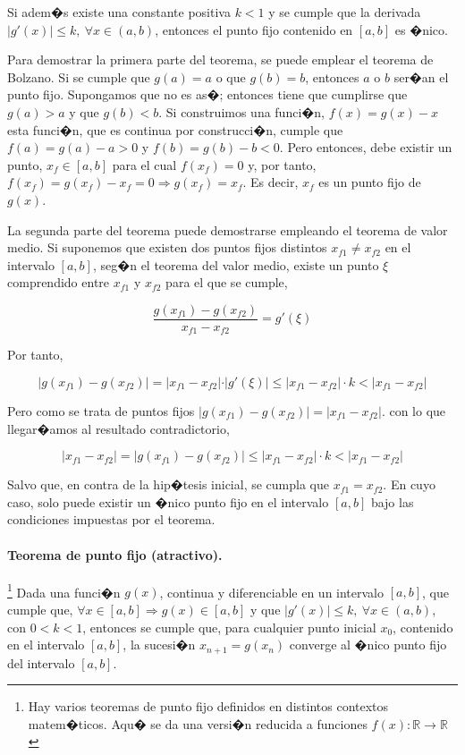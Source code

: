 Si adem�s existe una constante positiva $k < 1$  y se  cumple que  la derivada $\vert g'(x) \vert \leq k, \  \forall x \in (a, b)$, entonces el punto fijo contenido en $[a,b]$ es �nico. 

Para demostrar la primera parte del teorema, se puede emplear el teorema de Bolzano. Si se cumple que $g(a)=a$ o que  $g(b)=b$, entonces $a$ o $b$ ser�an el punto fijo. Supongamos que no es as�;  entonces tiene que cumplirse que $g(a)>a$ y que $g(b)<b$. Si construimos una funci�n, $f(x)=g(x)-x$ esta funci�n, que es continua por construcci�n, cumple que $f(a)=g(a)-a>0$ y $f(b)=g(b)-b<0$. Pero entonces, debe existir un punto, $x_f \in [a, b]$ para el cual $f(x_f)=0$ y, por tanto, $f(x_f)=g(x_f)-x_f=0 \Rightarrow g(x_f)=x_f$. Es decir, $x_f$ es un punto fijo de $g(x)$.

La segunda parte del teorema puede demostrarse empleando el teorema de valor medio. Si suponemos  que existen dos puntos fijos distintos $x_{f1} \neq x_{f2}$ en el intervalo $[a,b]$, seg�n el teorema del valor medio, existe un punto $\xi$ comprendido entre $x_{f1}$ y $ x_{f2}$ para el que se cumple,

\begin{equation*}
\frac{g(x_{f1})-g(x_{f2})}{x_{f1}-x_{f2}}=g'(\xi)
\end{equation*}

Por tanto,

\begin{equation*}
\vert g(x_{f1})-g(x_{f2}) \vert =\vert x_{f1}-x_{f2} \vert\cdot \vert g'(\xi) \vert \leq \vert x_{f1}-x_{f2} \vert \cdot k < \vert x_{f1}-x_{f2} \vert 
\end{equation*}

Pero como se trata de puntos fijos $\vert g(x_{f1})-g(x_{f2}) \vert =\vert x_{f1}-x_{f2}\vert $. con lo que llegar�amos al resultado contradictorio, 

 \begin{equation*}
\vert x_{f1}-x_{f2}\vert=\vert g(x_{f1})-g(x_{f2}) \vert  \leq \vert x_{f1}-x_{f2} \vert\cdot k < \vert x_{f1}-x_{f2} \vert 
\end{equation*}

Salvo que, en contra de la hip�tesis inicial, se cumpla que  $ x_{f1}=x_{f2}$. En cuyo caso, solo puede existir un �nico punto fijo en el intervalo $[a, b]$ bajo las condiciones impuestas por el teorema.

\paragraph{Teorema de punto fijo (atractivo).} \footnote{Hay varios teoremas de punto fijo definidos en distintos contextos matem�ticos. Aqu� se da una versi�n reducida a funciones $f(x):\mathbb{R} \rightarrow \mathbb{R}$} Dada una funci�n $g(x)$,  continua y diferenciable en un intervalo $[a, b]$, que  cumple que, $\forall x \in [a, b] \Rightarrow g(x)\in [a,b]$ y que  $\vert g'(x) \vert \leq k, \  \forall x \in (a, b)$, con $0<k<1$, entonces se cumple que, para cualquier punto inicial $x_0$, contenido en el intervalo $[a, b]$, la sucesi�n  $x_{n+1}=g(x_n)$ converge al �nico punto fijo del intervalo $[a, b]$.

